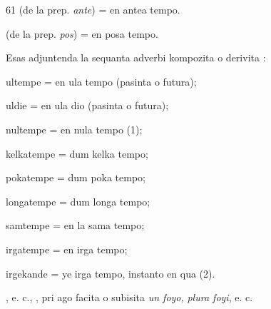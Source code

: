 \begin{VUpage}[65]{61}
 (de la prep. \textit{ante}) = en antea tempo.

 (de la prep. \textit{pos}) = en posa tempo.

\VUblancAlinea
Esas adjuntenda la sequanta adverbi kompozita o derivita :

\VUblancAlinea
ultempe = en ula tempo (pasinta o futura);

uldie = en ula dio (pasinta o futura);

nultempe = en nula tempo (1);

kelkatempe = dum kelka tempo;

pokatempe = dum poka tempo;

longatempe = dum longa tempo;

samtempe = en la sama tempo;

irgatempe = en irga tempo;

irgekande = ye irga tempo, instanto en qua (2).

\VUblancAlinea
{}, e. c., \cc
{}, pri ago facita o subisita \textit{un foyo,}\nl
\textit{plura foyi}, e. c.

\parplein
\end{VUpage}

